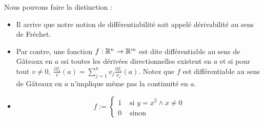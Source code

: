 \begin{remarque}
    Nous pouvons faire la distinction :
    \begin{itemize}
        \item Il arrive que notre notion de différentiabilité soit appelé dérivabilité au sens de Fréchet.
        \item Par contre, une fonction $f:\mathbb{R}^n\to\mathbb{R}^m$ est dite différentiable au sens de Gâteaux en $a$ ssi toutes les dérivées directionnelles existent en $a$ et si pour tout $v\ne0,\ \frac{\partial f_i}{v}(a)=\sum_{j=1}^nv_j\frac{\partial f_i}{x_j}(a)$.
        Notez que $f$ est différentiable au sens de Gâteaux en $a$ n'implique même pas la continuité en $a$.
    \end{itemize}    
\end{remarque}
\begin{exemple}
\begin{itemize}
    \item 

    $$f:=\begin{cases}
        1 &\text{ si } y =x^2\land x\ne 0\\
        0 &\text{ sinon}
    \end{cases}$$


\end{itemize}
\end{exemple}
